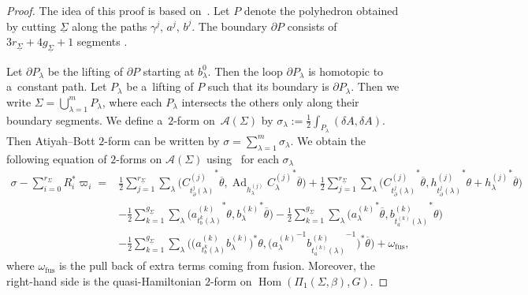 \documentclass[pdftex]{sigma}
\numberwithin{equation}{section}
\theoremstyle{definition}
\newcommand{\Hom}{\operatorname{Hom}}
\newcommand{\Ad}{\operatorname{Ad}}
\begin{document}
\begin{proof}
 The idea of this proof is based on~\cite[Theorem 9.3]{AMM}.
 Let $P$ denote the polyhedron obtained by cutting $\underline{\Sigma}$ along the paths $\gamma^j$, $a^j$, $b^j$.
 The boundary $\partial P$ consists of $3r_{\underline{\Sigma}} + 4g_{\underline{\Sigma}}+1$ segments
.

 Let $\partial P_\lambda$ be the lifting of $\partial P $ starting at $b^0_\lambda$.
 Then the loop $\partial P_\lambda$ is homotopic to a~constant path.
 Let $P_\lambda$ be a~lifting of $P$ such that its boundary is $\partial P_\lambda$.
 Then we write $\Sigma = \bigcup_{\lambda=1}^{m} P_\lambda $,
 where each $P_\lambda $ intersects the others only along their boundary segments.
 We define a~$2$-form on~$\mathcal{A}(\Sigma)$ by $\sigma_\lambda := \frac{1}{2} \int_{P_\lambda} (\delta A, \delta A)$.
 Then Atiyah--Bott $2$-form can be written by $\sigma = \sum_{\lambda=1}^{m} \sigma_\lambda$.
 We obtain the following equation of $2$-forms on $\mathcal{A}(\Sigma)$ using~\cite[Lemma 9.4]{AMM} for each $\sigma_{\lambda}$
 \begin{align*}
 \sigma-\sum_{i=0}^{r_{\Sigma}} R_{i}^* \varpi_i ={} & \frac{1}{2}\sum_{j=1}^{r_{\underline{\Sigma}}} \sum_{\lambda} \big({C^{(j)}_{t^{j}_{\partial}(\lambda)}}^*\overline{\theta}, \Ad_{h^{(j)}_{\lambda}} {C^{(j)}_{\lambda}}^* \overline{\theta}\big)
 + \frac{1}{2}\sum_{j=1}^{r_{\underline{\Sigma}}} \sum_{\lambda} \big({C^{(j)}_{t^{j}_{\partial}(\lambda)}}^*\overline{\theta}, {h^{(j)}_{t^{j}_{\partial}(\lambda)}}^*\theta + {h^{(j)}_{\lambda}}^*\overline{\theta}\big) \\
 &- \frac{1}{2}\sum_{k=1}^{g_{\underline{\Sigma}}} \sum_{\lambda} \big( {a^{(k)}_{t^{k}_b(\lambda)}}^*\theta, {b^{(k)}_{\lambda}}^*\overline{\theta} \big) -\frac{1}{2}\sum_{k=1}^{g_{\underline{\Sigma}}} \sum_{\lambda} \big( {a^{(k)}_{\lambda}}^*\overline{\theta}, {b^{(k)}_{t^{(k)}_{a}(\lambda)}}^*\theta \big) \\
 &- \frac{1}{2}\sum_{k=1}^{g_{\underline{\Sigma}}} \sum_{\lambda} \big( \bigl({a^{(k)}_{t^{k}_b(\lambda)}}b^{(k)}_{\lambda}\bigr)^* \theta, \bigl({a^{(k)}_{\lambda}}^{-1}{b^{(k)}_{t^{(k)}_{a}(\lambda)}}^{-1}\bigr)^* \overline{\theta}\big) + \omega_{\mathrm{fus}},
 \end{align*}
 where $\omega_{\mathrm{fus}}$ is the pull back of extra terms coming from fusion.
 Moreover, the right-hand side is the quasi-Hamiltonian $2$-form on $\Hom(\Pi_1(\Sigma,\beta),G)$.
\end{proof}
\end{document}
